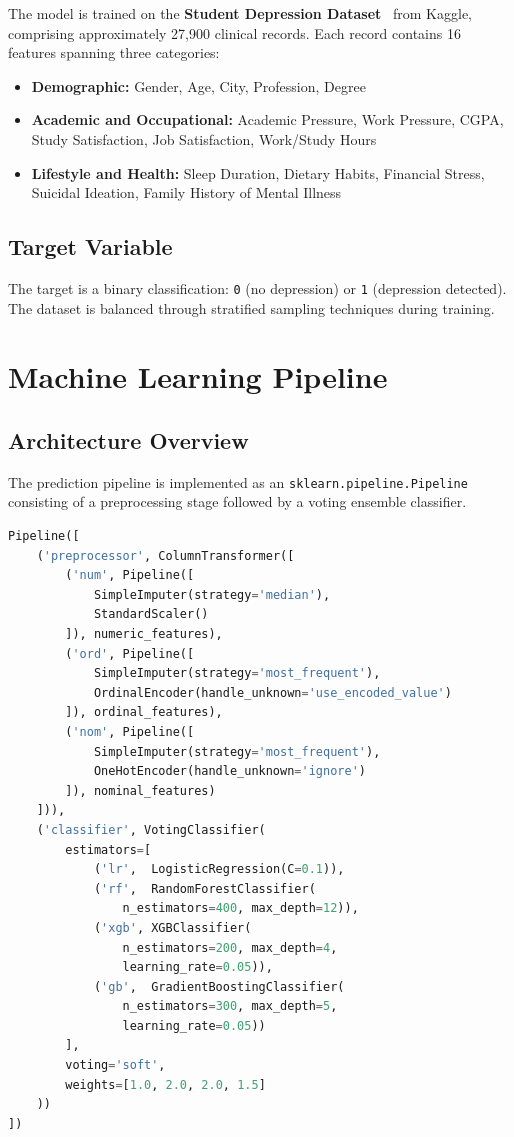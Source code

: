 \documentclass[11pt,a4paper]{article}
\begin{document}
The model is trained on the \textbf{Student Depression Dataset}~\cite{depression-dataset} from Kaggle, comprising approximately 27,900 clinical records. Each record contains 16 features spanning three categories:

\begin{itemize}[leftmargin=*,nosep]
    \item \textbf{Demographic:} Gender, Age, City, Profession, Degree
    \item \textbf{Academic and Occupational:} Academic Pressure, Work Pressure, CGPA, Study Satisfaction, Job Satisfaction, Work/Study Hours
    \item \textbf{Lifestyle and Health:} Sleep Duration, Dietary Habits, Financial Stress, Suicidal Ideation, Family History of Mental Illness
\end{itemize}

\subsection{Target Variable}

The target is a binary classification: \texttt{0} (no depression) or \texttt{1} (depression detected). The dataset is balanced through stratified sampling techniques during training.

\section{Machine Learning Pipeline}
\label{sec:pipeline}

\subsection{Architecture Overview}

The prediction pipeline is implemented as an \texttt{sklearn.pipeline.Pipeline} consisting of a preprocessing stage followed by a voting ensemble classifier.

\begin{lstlisting}[caption={High-level pipeline structure},language=Python]
Pipeline([
    ('preprocessor', ColumnTransformer([
        ('num', Pipeline([
            SimpleImputer(strategy='median'),
            StandardScaler()
        ]), numeric_features),
        ('ord', Pipeline([
            SimpleImputer(strategy='most_frequent'),
            OrdinalEncoder(handle_unknown='use_encoded_value')
        ]), ordinal_features),
        ('nom', Pipeline([
            SimpleImputer(strategy='most_frequent'),
            OneHotEncoder(handle_unknown='ignore')
        ]), nominal_features)
    ])),
    ('classifier', VotingClassifier(
        estimators=[
            ('lr',  LogisticRegression(C=0.1)),
            ('rf',  RandomForestClassifier(
                n_estimators=400, max_depth=12)),
            ('xgb', XGBClassifier(
                n_estimators=200, max_depth=4,
                learning_rate=0.05)),
            ('gb',  GradientBoostingClassifier(
                n_estimators=300, max_depth=5,
                learning_rate=0.05))
        ],
        voting='soft',
        weights=[1.0, 2.0, 2.0, 1.5]
    ))
])
\end{lstlisting}
\end{document}
